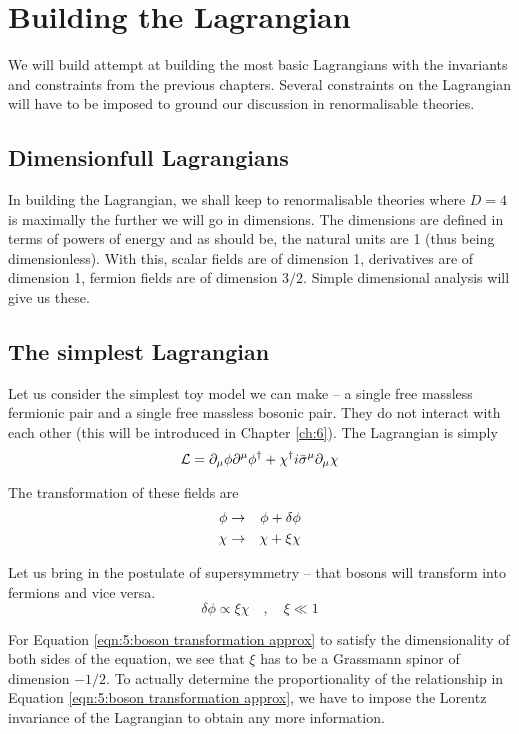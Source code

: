 \chapter{Building the Lagrangian}
\label{ch:5}

We will build attempt at building the most basic Lagrangians with the invariants and constraints from the previous chapters. Several constraints on the Lagrangian will have to be imposed to ground our discussion in renormalisable theories.

\section{Dimensionfull Lagrangians}
In building the Lagrangian, we shall keep to renormalisable theories where $D = 4$ is maximally the further we will go in dimensions. The dimensions are defined in terms of powers of energy and as should be, the natural units are 1 (thus being dimensionless). With this, scalar fields are of dimension 1, derivatives are of dimension 1, fermion fields are of dimension $3/2$. Simple dimensional analysis will give us these.

\section{The simplest Lagrangian}
Let us consider the simplest toy model we can make -- a single free massless fermionic pair and a single free massless bosonic pair. They do not interact with each other (this will be introduced in Chapter \ref{ch:6}). The Lagrangian is simply
\begin{equation}
    \mathcal{L} = \partial_\mu \phi \partial^\mu \phi^\dagger + \chi^\dagger i \Bar{\sigma}^\mu \partial_\mu \chi
\end{equation}

The transformation of these fields are
\begin{eqnarray}
    \phi &\rightarrow& \phi + \delta \phi \nonumber \\
    \chi &\rightarrow& \chi + \xi \chi \nonumber
\end{eqnarray}

Let us bring in the postulate of supersymmetry -- that bosons will transform into fermions and vice versa.
\begin{equation}
    \delta \phi \propto \xi \chi \quad , \quad \xi \ll 1
    \label{eqn:5:boson transformation approx}
\end{equation}

For Equation \ref{eqn:5:boson transformation approx} to satisfy the dimensionality of both sides of the equation, we see that $\xi$ has to be a Grassmann spinor of dimension $-1/2$. To actually determine the proportionality of the relationship in Equation \ref{eqn:5:boson transformation approx}, we have to impose the Lorentz invariance of the Lagrangian to obtain any more information.

